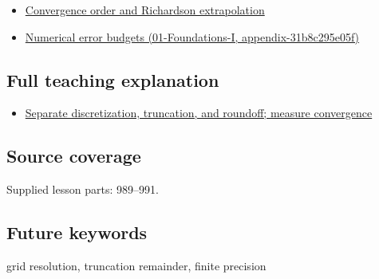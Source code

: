 \begin{itemize}
\tightlist
\item
  \hyperref[appendix-aca80b6bf17a]{Convergence order and Richardson extrapolation}
\item
  \href{}{Numerical error budgets (01-Foundations-I, appendix-31b8c295e05f)}
\end{itemize}

\subsection{Full teaching explanation}\label{full-teaching-explanation}

\begin{itemize}
\tightlist
\item
  \href{Continuous\%20Notes/Computing\%20Foundations\%20-\%20From\%20Bits\%20to\%20C++\%20and\%20Systems\%20APIs\#Separate\%20discretization,\%20truncation,\%20and\%20roundoff;\%20measure\%20convergence}{Separate discretization, truncation, and roundoff; measure convergence}
\end{itemize}

\subsection{Source coverage}\label{source-coverage}

Supplied lesson parts: 989--991.

\subsection{Future keywords}\label{future-keywords}

grid resolution, truncation remainder, finite precision
